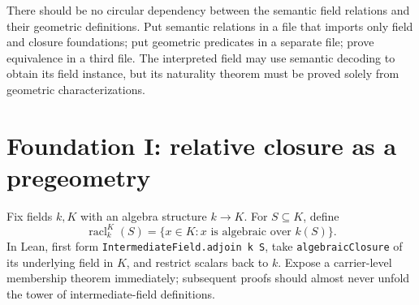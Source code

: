 \documentclass[11pt,oneside]{article}
\theoremstyle{definition}
\theoremstyle{remark}
\newcommand{\Qrel}{\mathcal{Q}}
\newcommand{\Qprel}{\mathcal{Q}'}
\newcommand{\Jrel}{\mathcal{J}}
\newcommand{\lean}[1]{\nolinkurl{#1}}
\begin{document}
\begin{center}
\end{center}

There should be no circular dependency between the semantic field relations and their
geometric definitions.  Put semantic relations in a file that imports only field and
closure foundations; put geometric predicates in a separate file; prove equivalence in a
third file.  The interpreted field may use semantic decoding to obtain its field instance,
but its naturality theorem must be proved solely from geometric characterizations.

\section{Foundation I: relative closure as a pregeometry}

Fix fields $k,K$ with an algebra structure $k\to K$.  For $S\subseteq K$, define
\[
  \operatorname{racl}_{k}^{K}(S)
  =\{x\in K:x\text{ is algebraic over }k(S)\}.
\]
In Lean, first form \lean{IntermediateField.adjoin k S}, take
\lean{algebraicClosure} of its underlying field in $K$, and restrict scalars back to $k$.
Expose a carrier-level membership theorem immediately; subsequent proofs should almost
never unfold the tower of intermediate-field definitions.
\end{document}
